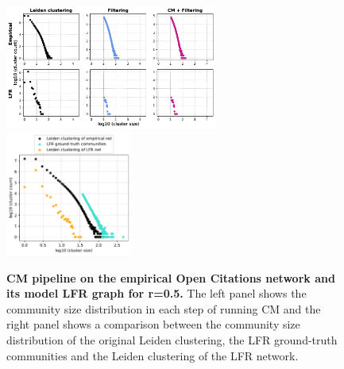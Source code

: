 \documentclass[a4paper]{article}   	%
\begin{document}
\begin{figure}[h!]
\centering
\includegraphics[width=0.62\textwidth]{figs/oc_cm_steps_lfr5.pdf}
\includegraphics[width=0.37\textwidth]{figs/oc_5_cm_size.pdf}
\caption[CM pipeline on the empirical Open Citations network and its model LFR graph for r=0.5]{\textbf{CM pipeline on the empirical Open Citations network and its model LFR graph for r=0.5.} The left panel shows the community size distribution in each step of running CM and the right panel shows a comparison between the community size distribution of the original Leiden clustering, the LFR ground-truth communities and the Leiden clustering of the LFR network.}
\label{fig:oc-cm-lfr-5}
\end{figure}
\end{document}

